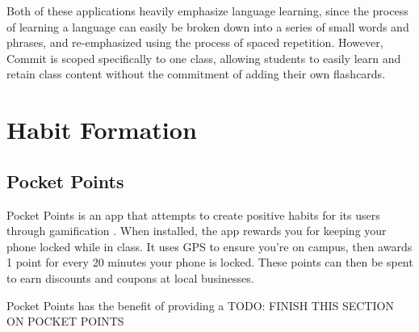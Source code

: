 \par Both of these applications heavily emphasize language learning, since the process of learning a language can easily be broken down into a series of small words and phrases, and re-emphasized using the process of spaced repetition. However, Commit is scoped specifically to one class, allowing students to easily learn and retain class content without the commitment of adding their own flashcards.



\section{Habit Formation}

\subsection{Pocket Points}
\par Pocket Points is an app that attempts to create positive habits for its users through gamification \cite{pocketpoints}. When installed, the app rewards you for keeping your phone locked while in class. It uses GPS to ensure you're on campus, then awards 1 point for every 20 minutes your phone is locked. These points can then be spent to earn discounts and coupons at local businesses.

\par Pocket Points has the benefit of providing a 
TODO: FINISH THIS SECTION ON POCKET POINTS


